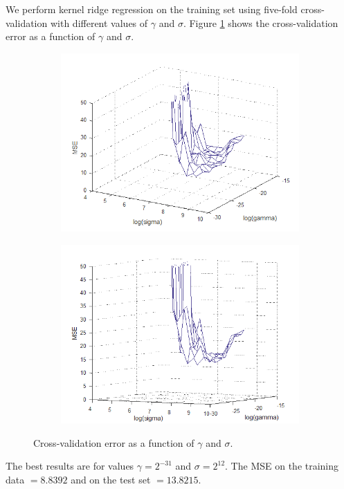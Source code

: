 \documentclass{article} %
\begin{document}
We perform kernel ridge regression on the training set using five-fold cross-validation with different values of $\gamma$ and $\sigma$. Figure \ref{fig:ex910} shows the cross-validation error as a function of $\gamma$ and $\sigma$. 
\begin{figure}[h]
    \centering
    \begin{subfigure}[b]{0.45\textwidth}
        \includegraphics[width=\textwidth]{ex910_1}
    \end{subfigure}
    \begin{subfigure}[b]{0.45\textwidth}
        \includegraphics[width=\textwidth]{ex910_2}
    \end{subfigure}
    \caption{Cross-validation error as a function of $\gamma$ and $\sigma$.}
    \label{fig:ex910}
\end{figure}
The best results are for values $\gamma = 2^{-31}$ and $\sigma = 2^{12}$. The MSE on the training data $= 8.8392$ and on the test set $= 13.8215$.
\end{document}
